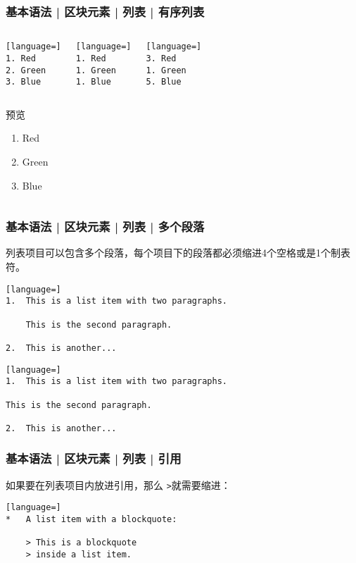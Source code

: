 \begin{frame}[fragile]
  \frametitle{基本语法 | 区块元素 | 列表 | \alert{有序列表}}
  \begin{columns}
\begin{lstlisting}[language=]
1. Red
2. Green
3. Blue
\end{lstlisting}
\begin{lstlisting}[language=]
1. Red
1. Green
1. Blue
\end{lstlisting}
\begin{lstlisting}[language=]
3. Red
1. Green
5. Blue
\end{lstlisting}
  \end{columns}
  \begin{columns}
  \begin{block}{预览}
    \begin{enumerate}
      \item Red
      \item Green
      \item Blue
    \end{enumerate}
  \end{block}
  \end{columns}
\end{frame}

\begin{frame}[fragile]
  \frametitle{基本语法 | 区块元素 | 列表 | 多个段落}
  列表项目可以包含多个段落，每个项目下的段落都必须缩进4个空格或是1个制表符。
\begin{lstlisting}[language=]
1.  This is a list item with two paragraphs.

    This is the second paragraph.

2.  This is another...
\end{lstlisting}
\pause
\begin{lstlisting}[language=]
1.  This is a list item with two paragraphs.

This is the second paragraph.

2.  This is another...
\end{lstlisting}
\end{frame}

\begin{frame}[fragile]
  \frametitle{基本语法 | 区块元素 | 列表 | 引用}
  如果要在列表项目内放进引用，那么 \verb|>|就需要缩进：
\begin{lstlisting}[language=]
*   A list item with a blockquote:

    > This is a blockquote
    > inside a list item.
\end{lstlisting}
\end{frame}

